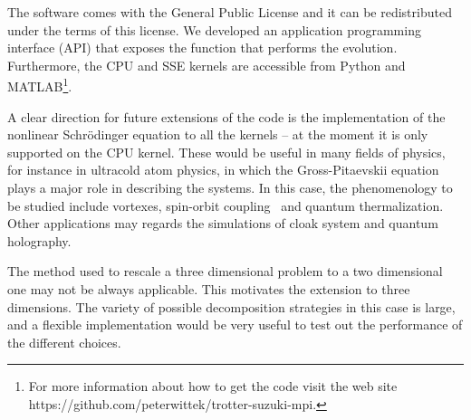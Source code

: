 The software comes with the General Public License and it can be redistributed under the terms of this license. We developed an application programming interface (API) that exposes the function that performs the evolution. Furthermore, the CPU and SSE kernels are accessible from Python and MATLAB\footnote{For more information about how to get the code visit the web site https://github.com/peterwittek/trotter-suzuki-mpi.}.

A clear direction for future extensions of the code is the implementation of the nonlinear Schr\"odinger equation to all the kernels -- at the moment it is only supported on the CPU kernel. These would be useful in many fields of physics, for instance in ultracold atom physics, in which the Gross-Pitaevskii equation plays a major role in describing the systems. In this case, the phenomenology to be studied include vortexes, spin-orbit coupling~\citep{GS13} and quantum thermalization. Other applications may regards the simulations of cloak system and quantum holography.

The method used to rescale a three dimensional problem to  a two dimensional one may not be always applicable. This motivates the extension to three dimensions. The variety of possible decomposition strategies in this case is large, and a flexible implementation would be very useful to test out the performance of the different choices.